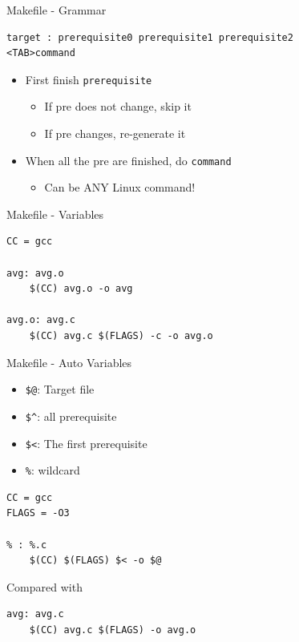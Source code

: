 \documentclass{../TexTemplate/myslide}
\begin{document}
\begin{frame}[fragile]{Makefile - Grammar}
\begin{verbatim}
target : prerequisite0 prerequisite1 prerequisite2
<TAB>command
\end{verbatim}
\begin{itemize}
	\item First finish \verb'prerequisite'
	\begin{itemize}
		\item If pre does not change, skip it
		\item If pre changes, re-generate it
	\end{itemize}
	\item When all the pre are finished, do \verb'command'
	\begin{itemize}
		\item Can be ANY Linux command!
	\end{itemize}
\end{itemize}
\end{frame}

\begin{frame}[fragile]{Makefile - Variables}
\begin{verbatim}
CC = gcc

avg: avg.o
	$(CC) avg.o -o avg

avg.o: avg.c
	$(CC) avg.c $(FLAGS) -c -o avg.o
\end{verbatim}
\end{frame}

\begin{frame}[fragile]{Makefile - Auto Variables}
\begin{itemize}
	\item \verb'$@': Target file
	\item \verb'$^': all prerequisite
	\item \verb'$<': The first prerequisite
	\item \verb'%': wildcard
\end{itemize}
\begin{verbatim}
CC = gcc
FLAGS = -O3

% : %.c
	$(CC) $(FLAGS) $< -o $@
\end{verbatim}
Compared with
\begin{verbatim}
avg: avg.c
	$(CC) avg.c $(FLAGS) -o avg.o
\end{verbatim}
\end{frame}
\end{document}
